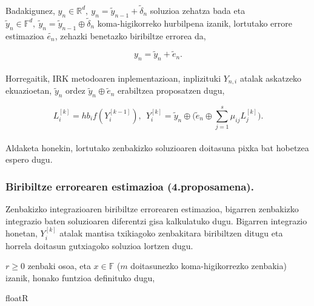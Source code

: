 \paragraph*{}Badakigunez, $y_n \in \mathbb{R}^{d}, \ y_n=\tilde y_{n-1}+\tilde \delta_n$ soluzioa zehatza bada eta $\tilde y_n \in \mathbb{F}^{d}, \ \tilde y_n=\tilde y_{n-1} \oplus \tilde \delta_n$ koma-higikorreko hurbilpena izanik, lortutako errore estimazioa $\tilde{e_n}$, zehazki benetazko biribiltze errorea da,

\begin{equation}
y_n=\tilde {y}_n+\tilde {e}_n. 
\end{equation}

\paragraph*{} Horregaitik, IRK metodoaren inplementazioan, inplizituki $Y_{n,i}$ atalak askatzeko ekuazioetan, $\tilde {y}_n$ ordez $\tilde{y}_n \oplus \tilde{e}_n$  erabiltzea proposatzen dugu,   

\begin{equation}
L_i^{[k]}=hb_if(Y_i^{[k-1]}), \ \ Y_i^{[k]}=\tilde{y}_n \oplus \big(\tilde{e}_n \oplus \sum\limits_{j=1}^{s} \mu_{ij} L_j^{[k]}\big).
\end{equation}

\paragraph{}Aldaketa honekin, lortutako zenbakizko soluzioaren doitasuna pixka bat hobetzea espero dugu. 


\subsubsection{Biribiltze errorearen estimazioa (4.proposamena).}

Zenbakizko integrazioaren biribiltze errorearen estimazioa, bigarren zenbakizko integrazio baten soluzioaren diferentzi gisa kalkulatuko dugu. Bigarren integrazio honetan, $Y_i^{[k]}$ atalak mantisa txikiagoko zenbakitara biribiltzen ditugu eta horrela doitasun gutxiagoko soluzioa lortzen dugu. 

$r\ge0$ zenbaki osoa, eta $x \in \mathbb{F}$ ($m$ doitasunezko koma-higikorrezko zenbakia) izanik, honako funtzioa definituko dugu,\\

\begin{algorithm}[H]
  \SetAlgoLined\DontPrintSemicolon
  \caption{floatR}
\end{algorithm} 

